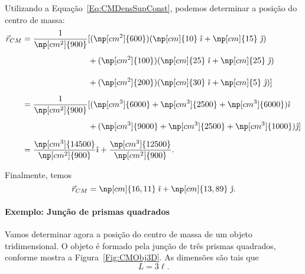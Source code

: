 \noindent{}Utilizando a Equação~\eqref{Eq:CMDensSupConst}, podemos determinar a posição do centro de massa:
\begin{align*}
    \vec{r}_{CM} &= \frac{1}{\np[cm^2]{900}} [(\np[cm^2]{600})(\np[cm]{10} \;\versi + \np[cm]{15} \;\versj) \\
    &\phantom{= \frac{1}{\np[cm^2]{900}} [}+ (\np[cm^2]{100})(\np[cm]{25} \;\versi + \np[cm]{25} \;\versj) \\
    &\phantom{= \frac{1}{\np[cm^2]{900}} [}+ (\np[cm^2]{200})(\np[cm]{30} \;\versi + \np[cm]{5} \;\versj)] \\
    &=\frac{1}{\np[cm^2]{900}}[(\np[cm^3]{6000} + \np[cm^3]{2500} + \np[cm^3]{6000})\versi \\
    &\phantom{= \frac{1}{\np[cm^2]{900}} [}+ (\np[cm^3]{9000}+ \np[cm^3]{2500} + \np[cm^3]{1000})\versj] \\
    &=\frac{\np[cm^3]{14500}}{\np[cm^2]{900}} \versi + \frac{\np[cm^3]{12500}}{\np[cm^2]{900}}.
\end{align*}

\noindent{}Finalmente, temos
\begin{equation}
    \vec{r}_{CM} = \np[cm]{16,11}\;\versi + \np[cm]{13,89}\;\versj.
\end{equation}

\paragraph{Exemplo: Junção de prismas quadrados}

Vamos determinar agora a posição do centro de massa de um objeto tridimensional. O objeto é formado pela junção de três prismas quadrados, conforme mostra a Figura~\ref{Fig:CMObj3D}. As dimensões são tais que
\begin{equation}
    L = 3 \ell.
\end{equation}

